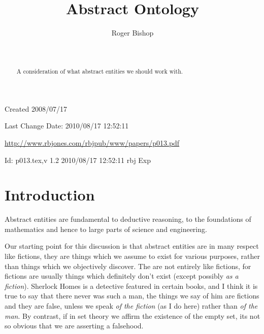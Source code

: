\documentclass[numreferences]{rbjk}
\begin{document}
                                                                                   
\begin{article}
\begin{opening}  
\title{Abstract Ontology}
\author{Roger Bishop }
\date{$ $\ $ $}

\begin{abstract}
A consideration of what abstract entities we should work with.
\end{abstract}

\end{opening}

\vfill

\begin{centering}
\footnotesize{
Created 2008/07/17

Last Change $ $Date: 2010/08/17 12:52:11 $ $

\href{http://www.rbjones.com/rbjpub/www/papers/p013.pdf}{http://www.rbjones.com/rbjpub/www/papers/p013.pdf}

$ $Id: p013.tex,v 1.2 2010/08/17 12:52:11 rbj Exp $ $\\

}%
\end{centering}

\newpage
\setcounter{tocdepth}{4}
{\parskip-0pt\tableofcontents}

\section{Introduction}

Abstract entities are fundamental to deductive reasoning, to the foundations of mathematics and hence to large parts of science and engineering.

Our starting point for this discussion is that abstract entities are in many respect like fictions, they are things which we assume to exist for various purposes, rather than things which we objectively discover.
The are not entirely like fictions, for fictions are usually things which definitely don't exist (except possibly \emph{as a fiction}).
Sherlock Homes is a detective featured in certain books, and I think it is true to say that there never was such a man, the things we say of him are fictions and they are false, unless we speak \emph{of the fiction} (as I do here) rather than \emph{of the man}.
By contrast, if in set theory we affirm the existence of the empty set, its not so obvious that we are asserting a falsehood.


\end{article}
\end{document}
